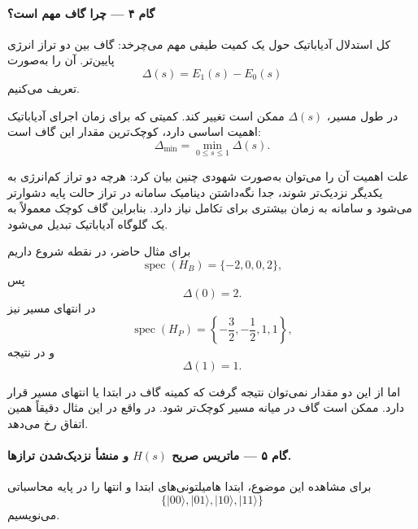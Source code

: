 \paragraph{گام ۴ --- چرا گاف مهم است؟}

کل استدلال آدیاباتیک حول یک کمیت طیفی مهم می‌چرخد: گاف بین دو تراز انرژی پایین‌تر. آن را به‌صورت
\begin{equation}
	\label{eq:instantaneous-gap-example}
	\Delta(s)
	=
	E_1(s)-E_0(s)
\end{equation}
تعریف می‌کنیم.

در طول مسیر، $\Delta(s)$ ممکن است تغییر کند. کمیتی که برای زمان اجرای آدیاباتیک اهمیت اساسی دارد، کوچک‌ترین مقدار این گاف است:
\begin{equation}
	\label{eq:min-gap-example}
	\Delta_{\min}
	=
	\min_{0\leq s\leq1}\Delta(s).
\end{equation}

علت اهمیت آن را می‌توان به‌صورت شهودی چنین بیان کرد: هرچه دو تراز کم‌انرژی به یکدیگر نزدیک‌تر شوند، جدا نگه‌داشتن دینامیک سامانه در تراز حالت پایه دشوارتر می‌شود و سامانه به زمان بیشتری برای تکامل نیاز دارد. بنابراین گاف کوچک معمولاً به یک گلوگاه آدیاباتیک تبدیل می‌شود.

برای مثال حاضر، در نقطه شروع داریم
\begin{equation}
	\operatorname{spec}(H_B)=\{-2,0,0,2\},
\end{equation}
پس
\begin{equation}
	\Delta(0)=2.
\end{equation}
در انتهای مسیر نیز
\begin{equation}
	\operatorname{spec}(H_P)
	=
	\left\{
	-\frac32,-\frac12,1,1
	\right\},
\end{equation}
و در نتیجه
\begin{equation}
	\Delta(1)=1.
\end{equation}

اما از این دو مقدار نمی‌توان نتیجه گرفت که کمینه گاف در ابتدا یا انتهای مسیر قرار دارد. ممکن است گاف در میانه مسیر کوچک‌تر شود. در واقع در این مثال دقیقاً همین اتفاق رخ می‌دهد.

\paragraph{گام ۵ --- ماتریس صریح $H(s)$ و منشأ نزدیک‌شدن ترازها.}

برای مشاهده این موضوع، ابتدا هامیلتونی‌های ابتدا و انتها را در پایه محاسباتی
\begin{equation}
	\{
	\lvert00\rangle,
	\lvert01\rangle,
	\lvert10\rangle,
	\lvert11\rangle
	\}
\end{equation}
می‌نویسیم.


